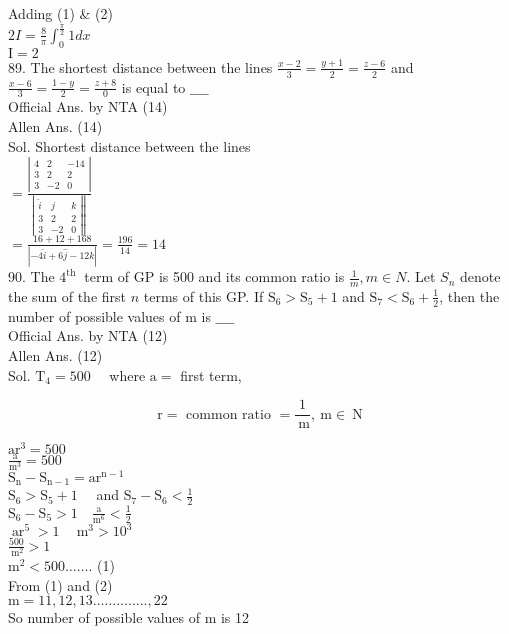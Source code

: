 \documentclass[10pt]{article}
\begin{document}
Adding (1) \& (2)\\
\(2 I=\frac{8}{\pi} \int_{0}^{\frac{\pi}{2}} 1 d x\)\\
\(\mathrm{I}=2\)\\
89. The shortest distance between the lines \(\frac{x-2}{3}=\frac{y+1}{2}=\frac{z-6}{2}\) and \(\frac{x-6}{3}=\frac{1-y}{2}=\frac{z+8}{0}\) is equal to \(\_\_\_\_\)\\
Official Ans. by NTA (14)\\
Allen Ans. (14)\\
Sol. Shortest distance between the lines\\
\(=\frac{\left|\begin{array}{ccc}4 & 2 & -14 \\ 3 & 2 & 2 \\ 3 & -2 & 0\end{array}\right|}{\left.\left|\begin{array}{ccc}\hat{i} & \hat{j} & k \\ 3 & 2 & 2 \\ 3 & -2 & 0\end{array}\right| \right\rvert\,}\)\\
\(=\frac{16+12+168}{|-4 \hat{i}+6 \hat{j}-12 k|}=\frac{196}{14}=14\)\\
90. The \(4^{\text {th }}\) term of GP is 500 and its common ratio is \(\frac{1}{m}, m \in N\). Let \(S_{n}\) denote the sum of the first \(n\) terms of this GP. If \(\mathrm{S}_{6}>\mathrm{S}_{5}+1\) and \(\mathrm{S}_{7}<\mathrm{S}_{6}+\frac{1}{2}\), then the number of possible values of m is \(\_\_\_\_\)\\
Official Ans. by NTA (12)\\
Allen Ans. (12)\\
Sol. \(\mathrm{T}_{4}=500 \quad\) where \(\mathrm{a}=\) first term,

\[
\mathrm{r}=\text { common ratio }=\frac{1}{\mathrm{~m}}, \mathrm{~m} \in \mathrm{~N}
\]

\(\mathrm{ar}^{3}=500\)\\
\(\frac{\mathrm{a}}{\mathrm{m}^{3}}=500\)\\
\(\mathrm{S}_{\mathrm{n}}-\mathrm{S}_{\mathrm{n}-1}=\mathrm{ar}^{\mathrm{n}-1}\)\\
\(\mathrm{S}_{6}>\mathrm{S}_{5}+1 \quad\) and \(\mathrm{S}_{7}-\mathrm{S}_{6}<\frac{1}{2}\)\\
\(\mathrm{S}_{6}-\mathrm{S}_{5}>1 \quad \frac{\mathrm{a}}{\mathrm{m}^{6}}<\frac{1}{2}\)\\
\(\operatorname{ar}^{5}>1 \quad \mathrm{~m}^{3}>10^{3}\)\\
\(\frac{500}{\mathrm{~m}^{2}}>1\)\\
\(\mathrm{m}^{2}<500 \ldots \ldots\). (1)\\
From (1) and (2)\\
\(\mathrm{m}=11,12,13 \ldots \ldots \ldots \ldots . ., 22\)\\
So number of possible values of m is 12
\end{document}
